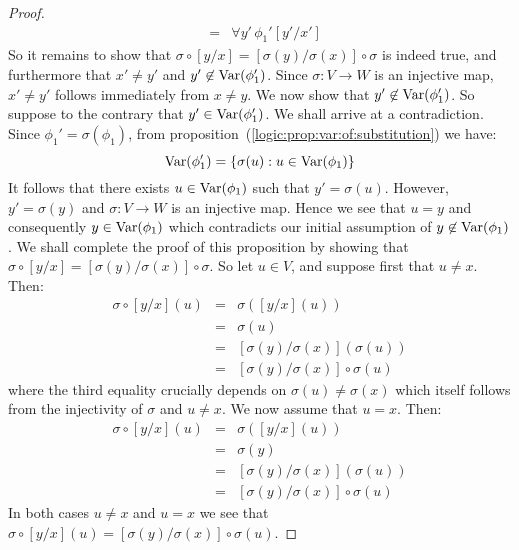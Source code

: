 \begin{proof}
\begin{eqnarray*}
    &=&\forall y'\,\phi_{1}'[y'/x']
    \end{eqnarray*}
So it remains to show that
$\sigma\circ[y/x]=[\sigma(y)/\sigma(x)]\circ\sigma$ is indeed true,
and furthermore that $x'\neq y'$ and $y'\not\in\mbox{\rm Var}(\phi_{1}')$.
Since $\sigma:V\to W$ is an injective map, $x'\neq y'$ follows
immediately from $x\neq y$. We now show that
$y'\not\in\mbox{\rm Var}(\phi_{1}')$. So suppose to the contrary that
$y'\in\mbox{\rm Var}(\phi_{1}')$. We shall arrive at a contradiction. Since
$\phi_{1}'=\sigma(\phi_{1})$, from
proposition~(\ref{logic:prop:var:of:substitution}) we have:
 \[ \mbox{\rm Var}(\phi_{1}')=\{\sigma(u):u\in\mbox{\rm Var}(\phi_{1})\}
 \]
It follows that there exists $u\in\mbox{\rm Var}(\phi_{1})$ such that
$y'=\sigma(u)$. However, $y'=\sigma(y)$ and $\sigma:V\to W$ is an
injective map. Hence we see that $u=y$ and consequently
$y\in\mbox{\rm Var}(\phi_{1})$ which contradicts our initial assumption of
$y\not\in\mbox{\rm Var}(\phi_{1})$. We shall complete the proof of this
proposition by showing that
$\sigma\circ[y/x]=[\sigma(y)/\sigma(x)]\circ\sigma$. So let $u\in
V$, and suppose first that $u\neq x$. Then:
    \begin{eqnarray*}
    \sigma\circ[y/x](u)&=&\sigma([y/x](u))\\
    &=&\sigma(u)\\
    &=&[\sigma(y)/\sigma(x)](\sigma(u))\\
    &=&[\sigma(y)/\sigma(x)]\circ\sigma(u)
    \end{eqnarray*}
where the third equality crucially depends on
$\sigma(u)\neq\sigma(x)$ which itself follows from the injectivity
of $\sigma$ and $u\neq x$. We now assume that $u=x$. Then:
     \begin{eqnarray*}
    \sigma\circ[y/x](u)&=&\sigma([y/x](u))\\
    &=&\sigma(y)\\
    &=&[\sigma(y)/\sigma(x)](\sigma(u))\\
    &=&[\sigma(y)/\sigma(x)]\circ\sigma(u)
    \end{eqnarray*}
In both cases $u\neq x$ and $u=x$ we see that
$\sigma\circ[y/x](u)=[\sigma(y)/\sigma(x)]\circ\sigma(u)$.
\end{proof}

